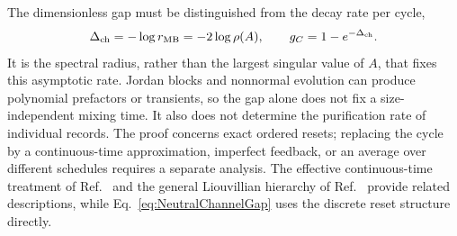 \documentclass[aps,prb,10pt,twocolumn,superscriptaddress,longbibliography,floatfix]{revtex4-2}
\begin{document}
{The dimensionless gap must be distinguished from the decay rate per cycle,
\begin{equation}
    \Delta_{\rm ch}=-\log r_{\rm MB}=-2\log\rho(A),
    \qquad g_C=1-e^{-\Delta_{\rm ch}}.
    \label{eq:ChannelRateVersusGap}
\end{equation}
It is the spectral radius, rather than the largest singular value of $A$, that fixes this asymptotic rate. Jordan blocks and nonnormal evolution can produce polynomial prefactors or transients, so the gap alone does not fix a size-independent mixing time. It also does not determine the purification rate of individual records. The proof concerns exact ordered resets; replacing the cycle by a continuous-time approximation, imperfect feedback, or an average over different schedules requires a separate analysis. The effective continuous-time treatment of Ref.~\cite{BhuiyanPanJian2026} and the general Liouvillian hierarchy of Ref.~\cite{BarthelZhang2022} provide related descriptions, while Eq.~\eqref{eq:NeutralChannelGap} uses the discrete reset structure directly.
}




\end{document}
